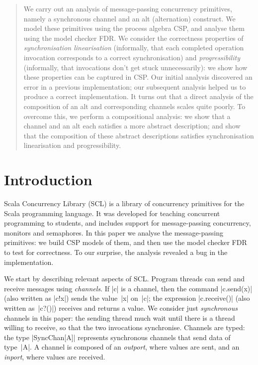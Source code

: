 \begin{abstract}
We carry out an analysis of message-passing concurrency primitives, namely a
synchronous channel and an alt (alternation) construct.  We model these
primitives using the process algebra CSP, and analyse them using the model
checker FDR.  We consider the correctness properties of \emph{synchronisation
  linearisation} (informally, that each completed operation invocation
corresponds to a correct synchronisation) and \emph{progressibility}
(informally, that invocations don't get stuck unnecessarily): we show how
these properties can be captured in CSP\@.  Our initial analysis discovered an
error in a previous implementation; our subsequent analysis helped us to
produce a correct implementation.  It turns out that a direct analysis of the
composition of an alt and corresponding channels scales quite poorly.  To
overcome this, we perform a compositional analysis: we show that a channel and
an alt each satisfies a more abstract description; and show that the
composition of these abstract descriptions satisfies synchronisation
linearisation and progressibility.
\end{abstract}


\section{Introduction}

Scala Concurrency Library (SCL) is a library of concurrency primitives for the
Scala programming language.  It was developed for teaching concurrent
programming to students, and includes support for message-passing concurrency,
monitors and semaphores.  In this paper we analyse the message-passing
primitives: we build CSP models of them, and then use the model checker FDR to
test for correctness.  To our surprise, the analysis revealed a bug in the
implementation.

We start by describing relevant aspects of SCL\@.  Program threads can send
and receive messages using \emph{channels}.  If |c| is a channel, then the
command |c.send(x)| (also written as |c!x|) sends the value~|x| on~|c|; the
expression |c.receive()| (also written as~|c?()|) receives and
returns a value.  We consider just \emph{synchronous} channels in this paper:
the sending thread much wait until there is a thread willing to receive, so
that the two invocations synchronise.  Channels are typed: the type
|SyncChan[A]| represents synchronous channels that send data of type~|A|.  A
channel is composed of an \emph{outport}, where values are sent, and an
\emph{inport}, where values are received.

